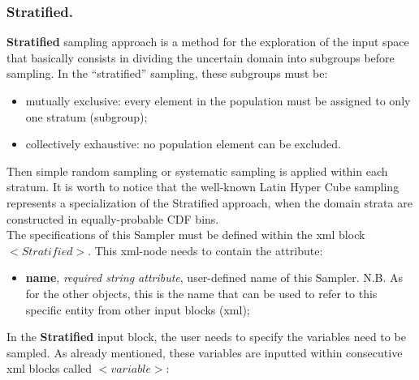 \subsubsection{Stratified.}
\label{subsubsubsec:Stratified}
\textbf{Stratified} sampling approach is a method for the exploration of the input space that basically consists in dividing the uncertain domain into  subgroups before sampling. In the ``stratified'' sampling, these subgroups must be:
\begin{itemize}
 \item mutually exclusive: every element in the population must be assigned to only one stratum (subgroup);
 \item collectively exhaustive: no population element can be excluded.
\end{itemize}
Then simple random sampling or systematic sampling is applied within each stratum. It is worth to notice that the well-known Latin Hyper Cube sampling represents a specialization of the Stratified approach, when the domain strata are constructed in equally-probable CDF bins.
\\ The specifications of this Sampler must be defined within the xml block $<Stratified>$. This xml-node needs to contain the attribute:
\begin{itemize}
\itemsep0em
\item \textbf{name}, \textit{required string attribute}, user-defined name of this Sampler. N.B. As for the other objects, this is the name that can be used to refer to this specific entity from other input blocks (xml);
\end{itemize}
In the \textbf{Stratified} input block, the user needs to specify the variables need to be sampled. As already mentioned, these variables are inputted within consecutive xml blocks called $<variable>$:
